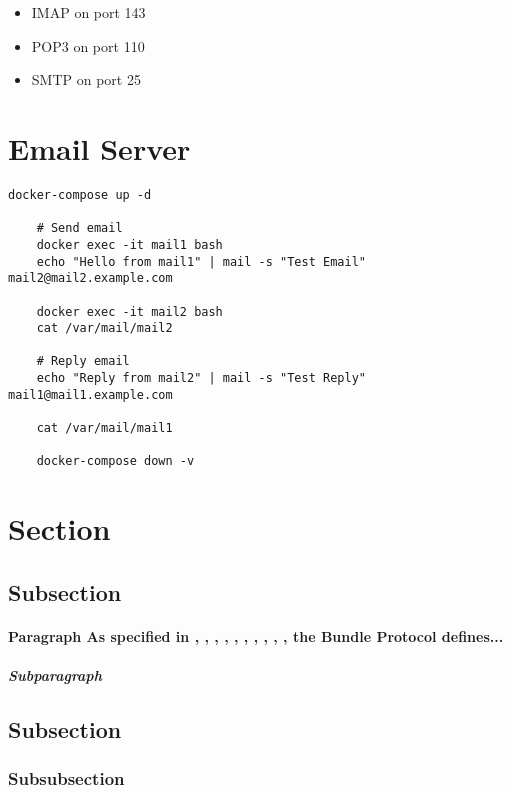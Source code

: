 \begin{itemize}
  \item IMAP on port 143
  \item POP3 on port 110
  \item SMTP on port 25
\end{itemize}

\section{Email Server}

\begin{lstlisting}[caption={Run Email Server Using Docker}]
    docker-compose up -d
    
    # Send email
    docker exec -it mail1 bash
    echo "Hello from mail1" | mail -s "Test Email" mail2@mail2.example.com
    
    docker exec -it mail2 bash
    cat /var/mail/mail2
    
    # Reply email
    echo "Reply from mail2" | mail -s "Test Reply" mail1@mail1.example.com
    
    cat /var/mail/mail1
    
    docker-compose down -v
\end{lstlisting}

\section{Section}
\subsection{Subsection}
\paragraph{Paragraph
As specified in 
\cite{rfc9171}, 
\cite{rfc4838}, 
\cite{rfc5598}, 
\cite{rfc6238}, 
\cite{rfc6749}, 
\cite{rfc7208}, 
\cite{rfc6376}, 
\cite{fall2003delay}, 
\cite{jain2004routing}, 
\cite{rfc5321}, 
the Bundle Protocol defines...}
\subparagraph{Subparagraph}

\subsection{Subsection}

\subsubsection{Subsubsection}